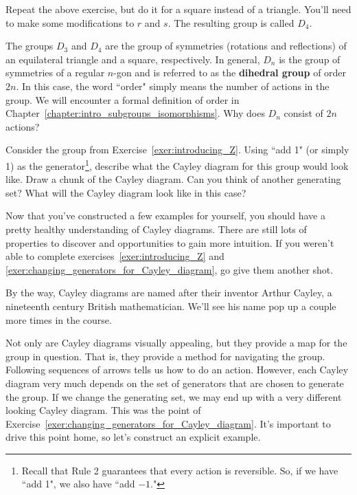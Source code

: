 \begin{exercise}\label{exer:introducing_D4}
Repeat the above exercise, but do it for a square instead of a triangle.  You'll need to make some modifications to $r$ and $s$.  The resulting group is called $D_4$.
\end{exercise}

The groups $D_3$ and $D_4$ are the group of symmetries (rotations and reflections) of an equilateral triangle and a square, respectively.  In general, $D_n$ is the group of symmetries of a regular $n$-gon and is referred to as the \textbf{dihedral group} of order $2n$. In this case, the word ``order" simply means the number of actions in the group.  We will encounter a formal definition of order in Chapter~\ref{chapter:intro_subgroups_isomorphisms}. Why does $D_n$ consist of $2n$ actions?

\begin{exercise}
Consider the group from Exercise~\ref{exer:introducing_Z}.  Using ``add 1" (or simply 1) as the generator\footnote{Recall that Rule 2 guarantees that every action is reversible.  So, if we have ``add 1", we also have ``add $-1$."}, describe what the Cayley diagram for this group would look like.  Draw a chunk of the Cayley diagram.  Can you think of another generating set?  What will the Cayley diagram look like in this case?
\end{exercise}

Now that you've constructed a few examples for yourself, you should have a pretty healthy understanding of Cayley diagrams.  There are still lots of properties to discover and opportunities to gain more intuition.  If you weren't able to complete exercises~\ref{exer:introducing_Z} and \ref{exer:changing_generators_for_Cayley_diagram}, go give them another shot.

By the way, Cayley diagrams are named after their inventor Arthur Cayley, a nineteenth century British mathematician.  We'll see his name pop up a couple more times in the course.  

Not only are Cayley diagrams visually appealing, but they provide a map for the group in question.  That is, they provide a method for navigating the group.  Following sequences of arrows tells us how to do an action.  However, each Cayley diagram very much depends on the set of generators that are chosen to generate the group.  If we change the generating set, we may end up with a very different looking Cayley diagram.  This was the point of Exercise~\ref{exer:changing_generators_for_Cayley_diagram}.  It's important to drive this point home, so let's construct an explicit example.

